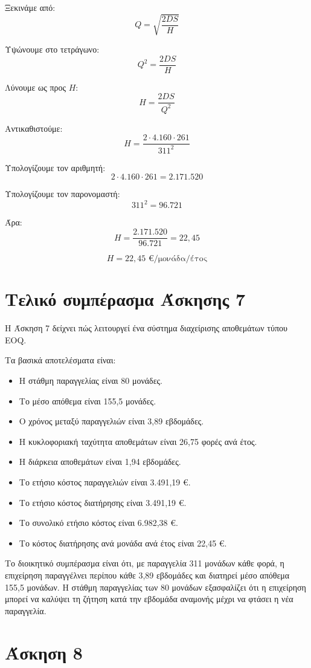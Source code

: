 \documentclass[12pt,a4paper]{article}
\begin{document}
Ξεκινάμε από:
\[
Q=\sqrt{\frac{2DS}{H}}
\]

Υψώνουμε στο τετράγωνο:
\[
Q^2=\frac{2DS}{H}
\]

Λύνουμε ως προς \(H\):
\[
H=\frac{2DS}{Q^2}
\]

Αντικαθιστούμε:
\[
H=\frac{2\cdot4.160\cdot261}{311^2}
\]

Υπολογίζουμε τον αριθμητή:
\[
2\cdot4.160\cdot261=2.171.520
\]

Υπολογίζουμε τον παρονομαστή:
\[
311^2=96.721
\]

Άρα:
\[
H=\frac{2.171.520}{96.721}=22{,}45
\]

\[
\boxed{H=22{,}45 \text{ €/μονάδα/έτος}}
\]

\section{Τελικό συμπέρασμα Άσκησης 7}

Η Άσκηση 7 δείχνει πώς λειτουργεί ένα σύστημα διαχείρισης αποθεμάτων τύπου EOQ.

Τα βασικά αποτελέσματα είναι:

\begin{itemize}
    \item Η στάθμη παραγγελίας είναι 80 μονάδες.
    \item Το μέσο απόθεμα είναι 155,5 μονάδες.
    \item Ο χρόνος μεταξύ παραγγελιών είναι 3,89 εβδομάδες.
    \item Η κυκλοφοριακή ταχύτητα αποθεμάτων είναι 26,75 φορές ανά έτος.
    \item Η διάρκεια αποθεμάτων είναι 1,94 εβδομάδες.
    \item Το ετήσιο κόστος παραγγελιών είναι 3.491,19 €.
    \item Το ετήσιο κόστος διατήρησης είναι 3.491,19 €.
    \item Το συνολικό ετήσιο κόστος είναι 6.982,38 €.
    \item Το κόστος διατήρησης ανά μονάδα ανά έτος είναι 22,45 €.
\end{itemize}

Το διοικητικό συμπέρασμα είναι ότι, με παραγγελία 311 μονάδων κάθε φορά, η επιχείρηση παραγγέλνει περίπου κάθε 3,89 εβδομάδες και διατηρεί μέσο απόθεμα 155,5 μονάδων. Η στάθμη παραγγελίας των 80 μονάδων εξασφαλίζει ότι η επιχείρηση μπορεί να καλύψει τη ζήτηση κατά την εβδομάδα αναμονής μέχρι να φτάσει η νέα παραγγελία.

\newpage

\section{Άσκηση 8}
\end{document}

